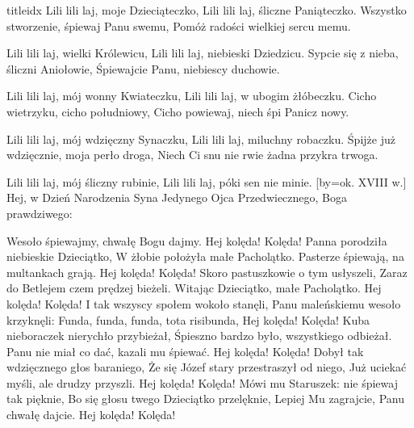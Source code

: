 \documentclass[a5paper, portrait, 12pt]{mwart}
\begin{document}
\begin{songs}{titleidx}
        Lili lili laj, moje Dzieciąteczko,
        Lili lili laj, śliczne Paniąteczko.
\endverse
\beginverse
    Wszystko stworzenie, śpiewaj Panu swemu,
    Pomóż radości wielkiej sercu memu.

        Lili lili laj, wielki Królewicu,
        Lili lili laj, niebieski Dziedzicu.
\endverse
\beginverse
    Sypcie się z nieba, śliczni Aniołowie,
    Śpiewajcie Panu, niebiescy duchowie.

        Lili lili laj, mój wonny Kwiateczku,
        Lili lili laj, w ubogim żłóbeczku.
\endverse
\beginverse
    Cicho wietrzyku, cicho południowy,
    Cicho powiewaj, niech śpi Panicz nowy.

        Lili lili laj, mój wdzięczny Synaczku,
        Lili lili laj, miluchny robaczku.
\endverse
\beginverse
    Śpijże już wdzięcznie, moja perło droga,
    Niech Ci snu nie rwie żadna przykra trwoga.

        Lili lili laj, mój śliczny rubinie,
        Lili lili laj, póki sen nie minie.
\endverse
\endsong
[by={ok. XVIII w.}]
\beginverse
    Hej, w Dzień Narodzenia Syna Jedynego
    Ojca Przedwiecznego, Boga prawdziwego:
\endverse		

\beginchorus
        Wesoło śpiewajmy, chwałę Bogu dajmy.
        Hej kolęda! Kolęda!
\endchorus
\beginverse
    Panna porodziła niebieskie Dzieciątko,
    W żłobie położyła małe Pacholątko.
\endverse		
\beginchorus
        Pasterze śpiewają, na multankach grają.
        Hej kolęda! Kolęda!	
\endchorus	
\beginverse
    Skoro pastuszkowie o tym usłyszeli,
    Zaraz do Betlejem czem prędzej bieżeli.
\endverse
\beginchorus
        Witając Dzieciątko, małe Pacholątko.
        Hej kolęda! Kolęda!
\endchorus
\beginverse
    I tak wszyscy społem wokoło stanęli,
    Panu maleńskiemu wesoło krzyknęli:
\endverse
\beginchorus
	Funda, funda, funda, tota risibunda,
        Hej kolęda! Kolęda!
\endchorus
\beginverse
    Kuba nieboraczek nierychło przybieżał,
    Śpieszno bardzo było, wszystkiego odbieżał.
\endverse
\beginchorus
        Panu nie miał co dać, kazali mu śpiewać.
        Hej kolęda! Kolęda!
\endchorus
\beginverse
    Dobył tak wdzięcznego głos baraniego,
    Że się Józef stary przestraszył od niego,
\endverse
\beginchorus
    Już uciekać myśli, ale drudzy przyszli.
    Hej kolęda! Kolęda!
\endchorus
\beginverse
    Mówi mu Staruszek: nie śpiewaj tak pięknie,
    Bo się głosu twego Dzieciątko przelęknie,
\endverse
\beginchorus
        Lepiej Mu zagrajcie, Panu chwałę dajcie.
        Hej kolęda! Kolęda!
\endchorus
\endsong





\end{songs}
\end{document}
